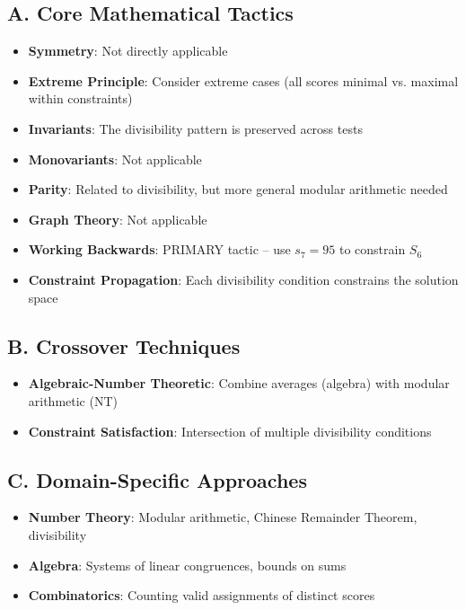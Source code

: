 \documentclass[11pt]{article}
\begin{document}
\begin{tacticalbox}
\subsection*{A. Core Mathematical Tactics}
\begin{itemize}[leftmargin=*]
    \item \textbf{Symmetry}: Not directly applicable
    
    \item \textbf{Extreme Principle}: Consider extreme cases (all scores minimal vs. maximal within constraints)
    
    \item \textbf{Invariants}: The divisibility pattern is preserved across tests
    
    \item \textbf{Monovariants}: Not applicable
    
    \item \textbf{Parity}: Related to divisibility, but more general modular arithmetic needed
    
    \item \textbf{Graph Theory}: Not applicable
    
    \item \textbf{Working Backwards}: PRIMARY tactic -- use $s_7 = 95$ to constrain $S_6$
    
    \item \textbf{Constraint Propagation}: Each divisibility condition constrains the solution space
\end{itemize}

\subsection*{B. Crossover Techniques}
\begin{itemize}[leftmargin=*]
    \item \textbf{Algebraic-Number Theoretic}: Combine averages (algebra) with modular arithmetic (NT)
    
    \item \textbf{Constraint Satisfaction}: Intersection of multiple divisibility conditions
\end{itemize}

\subsection*{C. Domain-Specific Approaches}
\begin{itemize}[leftmargin=*]
    \item \textbf{Number Theory}: Modular arithmetic, Chinese Remainder Theorem, divisibility
    
    \item \textbf{Algebra}: Systems of linear congruences, bounds on sums
    
    \item \textbf{Combinatorics}: Counting valid assignments of distinct scores
\end{itemize}
\end{tacticalbox}
\end{document}
